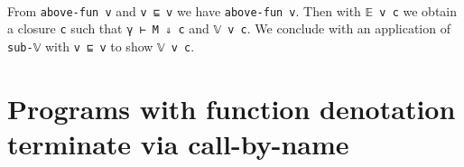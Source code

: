 \begin{fence}
\begin{code}%
\>[0]\AgdaSpace{}%
\AgdaSymbol{\{}\AgdaSpace{}%
\AgdaSpace{}%
\AgdaSymbol{\}}\AgdaSpace{}%
\AgdaSymbol{\{}\AgdaSymbol{\}}\AgdaSpace{}%
\AgdaSymbol{\{}\AgdaSymbol{\}}\AgdaSpace{}%
\AgdaSpace{}%
\AgdaSpace{}%
\<%
\\
\>[0][@{}l@{\AgdaIndent{0}}]%
\>[4]\AgdaSpace{}%
\AgdaSpace{}%
\AgdaSymbol{(}\AgdaSpace{}%
\AgdaSpace{}%
\AgdaSymbol{)}\<%
\\
\>[0]\AgdaSpace{}%
\AgdaSymbol{|}%
\>[1336I]\AgdaSpace{}%
\AgdaSpace{}%
\AgdaOperator{\AgdaInductiveConstructor{,}}\AgdaSpace{}%
\AgdaSpace{}%
\AgdaSpace{}%
\AgdaOperator{\AgdaInductiveConstructor{,}}\AgdaSpace{}%
\AgdaSpace{}%
\AgdaSpace{}%
\AgdaSpace{}%
\AgdaSymbol{=}\<%
\\
\>[.][@{}l@{}]\<[1336I]%
\>[6]\AgdaSpace{}%
\AgdaSpace{}%
\AgdaOperator{\AgdaInductiveConstructor{,}}\AgdaSpace{}%
\AgdaSpace{}%
\AgdaSpace{}%
\AgdaOperator{\AgdaInductiveConstructor{,}}\AgdaSpace{}%
\AgdaSpace{}%
\AgdaSpace{}%
\AgdaSpace{}%
\AgdaSpace{}%
\<%
\end{code}
\end{fence}

From \texttt{above-fun\ v\textquotesingle{}} and
\texttt{v\textquotesingle{}\ ⊑\ v} we have \texttt{above-fun\ v}. Then
with \texttt{𝔼\ v\ c} we obtain a closure \texttt{c} such that
\texttt{γ\ ⊢\ M\ ⇓\ c} and \texttt{𝕍\ v\ c}. We conclude with an
application of \texttt{sub-𝕍} with \texttt{v\textquotesingle{}\ ⊑\ v} to
show \texttt{𝕍\ v\textquotesingle{}\ c}.

\hypertarget{programs-with-function-denotation-terminate-via-call-by-name}{%
\section{Programs with function denotation terminate via
call-by-name}\label{programs-with-function-denotation-terminate-via-call-by-name}}

